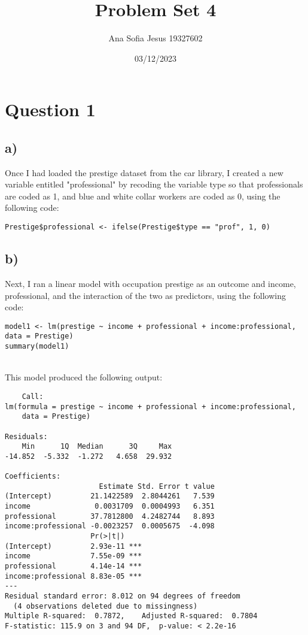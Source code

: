\documentclass[oneside]{article}
\title{Problem Set 4}
\author{Ana Sofia Jesus 19327602}
\date{03/12/2023}
\begin{document}
\maketitle

\section*{Question 1}

\subsection*{a)}
Once I had loaded the prestige dataset from the car library, I created a new variable entitled "professional" by recoding the variable type so that professionals are coded as 1, and blue and white collar workers are coded as 0, using the following code:

\begin{verbatim}
Prestige$professional <- ifelse(Prestige$type == "prof", 1, 0)
\end{verbatim}

\subsection*{b)}
Next, I ran a linear model with occupation prestige as an outcome and income, professional, and the interaction of the two as predictors, using the following code:

\begin{verbatim}    
model1 <- lm(prestige ~ income + professional + income:professional, data = Prestige)
summary(model1)
\end{verbatim}
\\
This model produced the following output:

\begin{verbatim}
    Call:
lm(formula = prestige ~ income + professional + income:professional, 
    data = Prestige)

Residuals:
    Min      1Q  Median      3Q     Max 
-14.852  -5.332  -1.272   4.658  29.932 

Coefficients:
                      Estimate Std. Error t value
(Intercept)         21.1422589  2.8044261   7.539
income               0.0031709  0.0004993   6.351
professional        37.7812800  4.2482744   8.893
income:professional -0.0023257  0.0005675  -4.098
                    Pr(>|t|)    
(Intercept)         2.93e-11 ***
income              7.55e-09 ***
professional        4.14e-14 ***
income:professional 8.83e-05 ***
---
Residual standard error: 8.012 on 94 degrees of freedom
  (4 observations deleted due to missingness)
Multiple R-squared:  0.7872,	Adjusted R-squared:  0.7804 
F-statistic: 115.9 on 3 and 94 DF,  p-value: < 2.2e-16
\end{verbatim}
\end{document}
